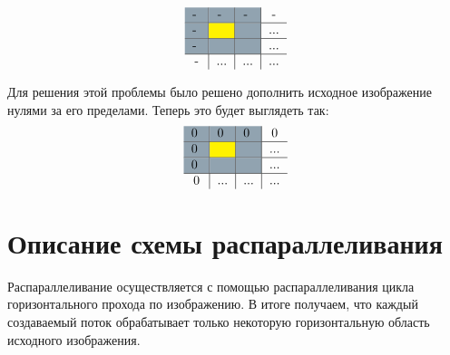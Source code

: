 \documentclass{report}
\begin{document}
$$\begin{tabular}{c|c|c|c}
 - \cellcolor{grey} & - \cellcolor{grey} & - \cellcolor{grey} & - \\
\hline
- \cellcolor{grey} & \cellcolor{yellow}&  \cellcolor{grey} & ...  \\
\hline
- \cellcolor{grey} &\cellcolor{grey}  & \cellcolor{grey} & ... \\
\hline
-  & ...  & ... & ... \\
\end{tabular}$$
\par Для решения этой проблемы было решено дополнить исходное изображение нулями за его пределами. Теперь это будет выглядеть так:
$$\begin{tabular}{c|c|c|c}
0 \cellcolor{grey} & 0 \cellcolor{grey} & 0 \cellcolor{grey} & 0 \\
\hline
0 \cellcolor{grey} & \cellcolor{yellow}&  \cellcolor{grey} & ...  \\
\hline
0 \cellcolor{grey} &\cellcolor{grey}  & \cellcolor{grey} & ... \\
\hline
0  & ...  & ... & ... \\
\end{tabular}$$
\newpage

\section*{Описание схемы распараллеливания}
\par Распараллеливание осуществляется с помощью распараллеливания цикла горизонтального прохода по изображению. В итоге получаем, что каждый создаваемый поток обрабатывает только некоторую горизонтальную область исходного изображения.

\newpage

\end{document}
